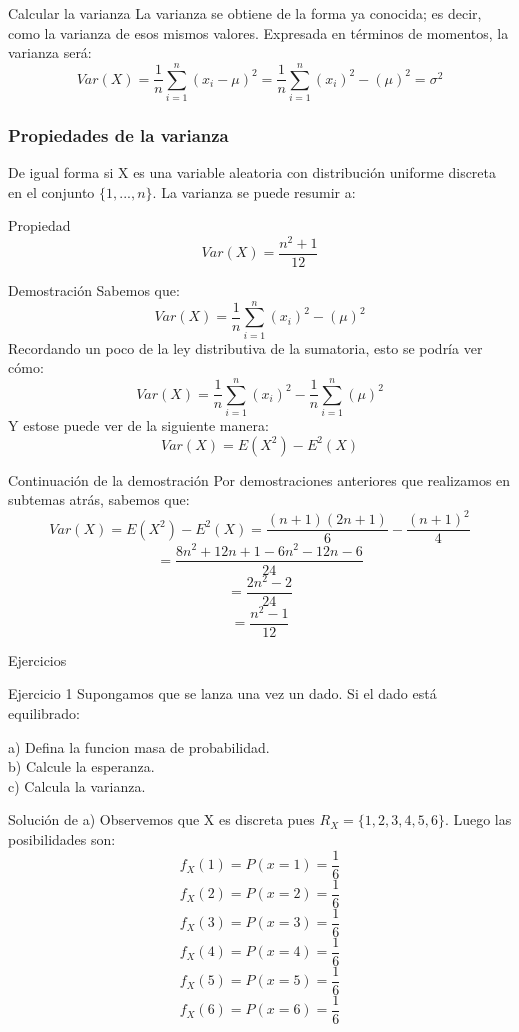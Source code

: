 \documentclass[11pt]{beamer}
\begin{document}
\begin{frame}{Calcular la varianza}
La varianza se obtiene de la forma ya conocida; es decir, como la varianza de esos mismos valores. Expresada en términos de momentos, la varianza será:
$$Var(X)=\dfrac{1}{n}\sum_{i=1}^{n}(x_{i}-\mu)^{2}= \dfrac{1}{n}\sum_{i=1}^{n}(x_{i})^2 - (\mu)^{2} =\sigma ^{2}$$
\end{frame} 

\begin{frame}\frametitle{Propiedades de la varianza}
De igual forma si X es una variable aleatoria  con distribución uniforme discreta en el conjunto $\lbrace 1,...,n \rbrace$. La varianza se puede resumir a:
\begin{block}{Propiedad}
$$Var(X) = \dfrac{n^{2} + 1}{12}$$
\end{block}
\end{frame}

\begin{frame}{Demostración}
Sabemos que:
$$Var(X)= \dfrac{1}{n}\sum_{i=1}^{n}(x_{i})^2 -(\mu)^{2}$$
Recordando un poco de la ley distributiva de la sumatoria, esto se podría ver cómo:
$$Var(X) =  \dfrac{1}{n}\sum_{i=1}^{n}(x_{i})^2 - \dfrac{1}{n}\sum_{i=1}^{n}(\mu)^{2}$$
Y estose puede ver de la siguiente manera:
$$Var(X) =E(X^2) - E^2(X)$$
\end{frame}

\begin{frame}{Continuación de la demostración}
Por demostraciones anteriores que realizamos en subtemas atrás, sabemos que:
$$Var(X) = E(X^2) - E^2(X)= \dfrac{(n + 1)(2n + 1)}{6} - \dfrac{(n +1)^2}{4}$$
$$=\dfrac{8n^2 + 12n + 1 - 6n^2 - 12n - 6}{24}$$
$$= \dfrac{2n^2 - 2}{24}$$
$$= \dfrac{n^2 - 1}{12}$$
\end{frame}

\begin{frame}{Ejercicios}
\begin{block}{Ejercicio 1}
Supongamos que se lanza una vez un dado. Si el dado está equilibrado:

a) Defina la funcion masa de probabilidad.\\
b) Calcule la esperanza.\\
c) Calcula la varianza.
\end{block}
\end{frame}

\begin{frame}{Solución de a)}
Observemos que X es discreta pues $R_{X}=\lbrace 1, 2, 3, 4, 5, 6 \rbrace$. Luego las posibilidades son:
$$f_{X}(1)=P(x=1)=\dfrac{1}{6}$$
$$f_{X}(2)=P(x=2)=\dfrac{1}{6}$$$$f_{X}(3)=P(x=3)=\dfrac{1}{6}$$
$$f_{X}(4)=P(x=4)=\dfrac{1}{6}$$
$$f_{X}(5)=P(x=5)=\dfrac{1}{6}$$
$$f_{X}(6)=P(x=6)=\dfrac{1}{6}$$
\end{frame}
\end{document}
